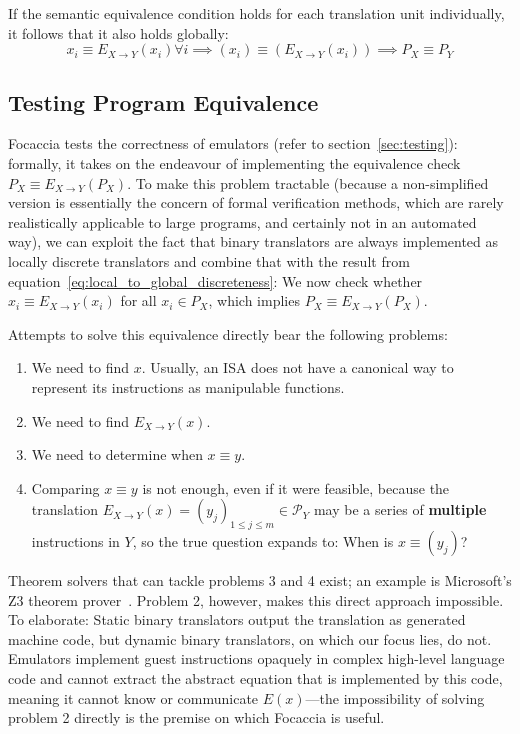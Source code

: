 If the semantic equivalence condition holds for each translation unit individually, it follows that it also holds globally:
\begin{equation}\label{eq:local_to_global_discreteness}
    x_i \equiv E_{X\rightarrow Y}(x_i) \forall i \implies (x_i) \equiv (E_{X\rightarrow Y}(x_i)) \implies P_X \equiv P_Y
\end{equation}

\subsection{Testing Program Equivalence}\label{sec:program_equiv}

Focaccia tests the correctness of emulators (refer to section~\ref{sec:testing}): formally, it takes on the endeavour of
implementing the equivalence check $P_X \equiv E_{X \rightarrow Y}(P_X)$. To make this problem tractable (because a
non-simplified version is essentially the concern of formal verification methods, which are rarely realistically
applicable to large programs, and certainly not in an automated way), we can exploit the fact that binary translators
are always implemented as locally discrete translators and combine that with the result from
equation~\ref{eq:local_to_global_discreteness}: We now check whether $x_i \equiv E_{X \rightarrow Y}(x_i)$ for all $x_i
\in P_X$, which implies $P_X \equiv E_{X \rightarrow Y}(P_X)$.

Attempts to solve this equivalence directly bear the following problems:

\begin{enumerate}
    \item We need to find $x$. Usually, an \ac{ISA} does not have a canonical way to represent its instructions as
        manipulable functions.
    \item We need to find $E_{X \rightarrow Y}(x)$.
    \item We need to determine when $x \equiv y$.
    \item Comparing $x \equiv y$ is not enough, even if it were feasible, because the translation $E_{X \rightarrow
        Y}(x) = (y_j)_{1 \leq j \leq m} \in \mathcal{P}_Y$ may be a series of \textbf{multiple} instructions in $Y$, so
        the true question expands to: When is $x \equiv (y_j)$?
\end{enumerate}

Theorem solvers that can tackle problems 3 and 4 exist; an example is Microsoft's Z3 theorem
prover~\cite{Z3prover2024Mar}. Problem 2, however, makes this direct approach impossible. To elaborate: Static binary
translators output the translation as generated machine code, but dynamic binary translators, on which our focus lies,
do not. Emulators implement guest instructions opaquely in complex high-level language code and cannot extract the
abstract equation that is implemented by this code, meaning it cannot know or communicate $E(x)$---the impossibility of
solving problem 2 directly is the premise on which Focaccia is useful.

